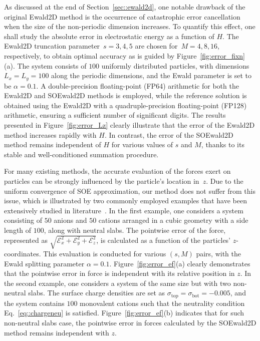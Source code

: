 As discussed at the end of Section~\ref{sec::ewald2d}, one notable drawback of the original Ewald2D method is the occurrence of catastrophic error cancellation when the size of the non-periodic dimension increases. 
To quantify this effect, one shall study the absolute error in electrostatic energy as a function of $H$. 
The Ewald2D truncation parameter~$s= 3, 4, 5$ are chosen for~$M = 4, 8, 16$, respectively, to obtain optimal accuracy as is guided by Figure~\ref{fig:error_fixn} (a).
The system consists of $100$ uniformly distributed particles, with dimensions $L_x = L_y = 100$ along the periodic dimensions, and the Ewald parameter is set to be $\alpha = 0.1$.
A double-precision floating-point (FP64) arithmetic for both the Ewald2D and SOEwald2D methods is employed, while the reference solution is obtained using the Ewald2D with a quadruple-precision floating-point (FP128) arithmetic, ensuring a sufficient number of significant digits. 
The results presented in Figure~\ref{fig:error_Lz} clearly illustrate that the error of the Ewald2D method increases rapidly with $H$.
In contrast, the error of the SOEwald2D method remains independent of $H$ for various values of $s$ and $M$, thanks to its stable and well-conditioned summation procedure.

For many existing methods, the accurate evaluation of the forces exert on particles can be strongly influenced by the particle's location in~$z$. 
Due to the uniform convergence of SOE approximation, our method does not suffer from this issue, which is illustrated by two commonly employed examples that have been extensively studied in literature~\cite{lindbo2012fast,de2002electrostatics}. 
In the first example, one considers a system consisting of $50$ anions and $50$ cations arranged in a cubic geometry with a side length of $100$, along with neutral slabs.  
The pointwise error of the force, represented as $\sqrt{\mathscr{E}_{x}^2+\mathscr{E}_{y}^2+\mathscr{E}_{z}^2}$,  is calculated as a function of the particles' $z$-coordinates. 
This evaluation is conducted for various $(s,M)$ pairs, with the Ewald splitting parameter $\alpha=0.1$. 
Figure~\ref{fig:error_ef}(a) clearly demonstrates that the pointwise error in force is independent with its relative position in $z$. 
In the second example, one considers a system of the same size but with two non-neutral slabs. 
The surface charge densities are set as $\sigma_{\mathrm{top}} = \sigma_{\mathrm{bot}} = -0.005$, and the system contains $100$ monovalent cations such that the neutrality condition Eq.~\eqref{eq::chargeneu} is satisfied. 
Figure~\ref{fig:error_ef}(b) indicates that for such non-neutral slabs case, the pointwise error in forces calculated by the SOEwald2D method remains independent with $z$.

